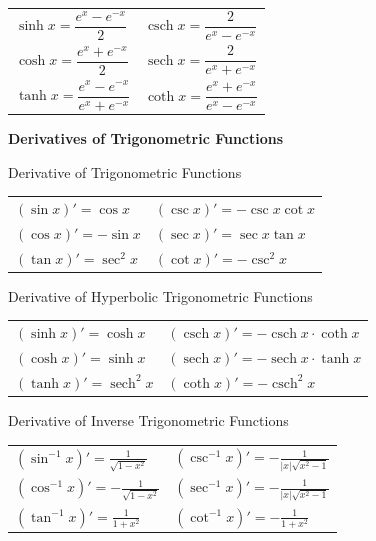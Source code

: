 \documentclass{article}
\DeclareMathOperator{\sech}{sech}
\DeclareMathOperator{\csch}{csch}
\begin{document}
\begin{center}
\begin{tabular}{ll}
$\sinh x = \dfrac{e^x - e^{-x}}{2}$ & $\csch x = \dfrac{2}{e^x - e^{-x}}$\\
 $\cosh x = \dfrac{e^x + e^{-x}}{2}$ & $\sech x = \dfrac{2}{e^x + e^{-x}}$\\
 $\tanh x = \dfrac{e^x - e^{-x}}{e^x + e^{-x}}$ & $\coth x = \dfrac{e^x + e^{-x}}{e^x - e^{-x}}$
\end{tabular}

\vspace{0.5cm}

\textbf{Derivatives of Trigonometric Functions}

\vspace{0.3cm}

\begin{minipage}{0.4\linewidth}
Derivative of Trigonometric Functions\\
\begin{tabular}{ll}
$(\sin x)' = \cos x$ & $(\csc x)' = -\csc x \cot x$\\
$(\cos x)' = -\sin x$ & $(\sec x)' = \sec x \tan x$\\
$(\tan x)' = \sec^2 x$ & $(\cot x)' = -\csc^2 x$
\end{tabular}
\end{minipage}
\hspace{0.3cm}
\begin{minipage}{0.55\linewidth}
Derivative of Hyperbolic Trigonometric Functions\\
\begin{tabular}{ll}
$(\sinh x)' = \cosh x$ & $(\csch x)' = -\csch x \cdot \coth x$\\
$(\cosh x)' = \sinh x$ & $(\sech x)' = -\sech x \cdot \tanh x$\\
$(\tanh x)' = \sech^{2} x$ & $(\coth x)' = -\csch^2 x$\\
\end{tabular}
\end{minipage}

\vspace{0.5cm}

\begin{minipage}{0.5\linewidth}
  Derivative of Inverse Trigonometric Functions\\
\begin{tabular}{ll}
$(\sin^{-1} x)' = \displaystyle\frac{1}{\sqrt{1-x^2}}$ & $(\csc^{-1} x )' = \displaystyle - \frac{1}{|x|\sqrt{x^2 - 1}}$\\
$(\cos^{-1} x)' = - \displaystyle\frac{1}{\sqrt{1-x^2}}$ & $(\sec^{-1} x )' = \displaystyle - \frac{1}{|x|\sqrt{x^2 - 1}}$\\
$(\tan^{-1} x )' = \displaystyle\frac{1}{1+x^2}$ & $(\cot^{-1} x )' = -\displaystyle\frac{1}{1 + x^2}$
\end{tabular}
\end{minipage}

\end{center}
\end{document}
